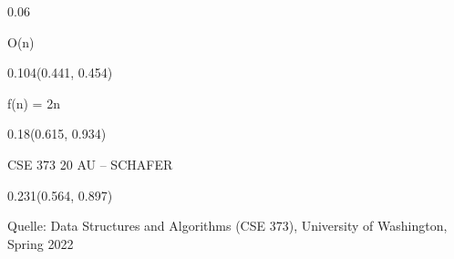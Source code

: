 \documentclass[aspectratio=169]{beamer}
\begin{document}
\begin{frame}[fragile]
\begin{textblock}{0.06}
\begin{minipage}[t][0.058\paperheight]{\linewidth}
    O(n)
  \end{minipage}
\end{textblock}
\begin{textblock}{0.104}(0.441, 0.454)
  \begin{minipage}[t][0.058\paperheight]{\linewidth}
    \tiny
    f(n) = 2n
  \end{minipage}
\end{textblock}
\begin{textblock}{0.18}(0.615, 0.934)
  \begin{minipage}[b][0.032\paperheight]{\linewidth}
    \raggedright
    \fontsize{3}{3.3}\selectfont
    CSE 373 20 AU – SCHAFER
  \end{minipage}
\end{textblock}
\begin{textblock}{0.231}(0.564, 0.897)
  \begin{minipage}[b][0.032\paperheight]{\linewidth}
    \raggedright
    \fontsize{3}{3.3}\selectfont
    Quelle: Data Structures and Algorithms (CSE 373), University of Washington, Spring 2022
  \end{minipage}
\end{textblock}
\end{frame}
\end{document}
